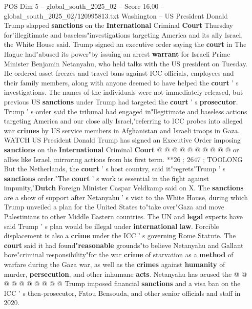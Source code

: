 \begin{textsample}{POS Dim 5 – global\_south\_2025\_02 – Score 16.00 – global\_south\_2025\_02/120995813.txt}  \label{ex:f5_pos_214}
Washington -- US President Donald Trump slapped \textbf{sanctions} on the \textbf{International} Criminal \textbf{Court} Thursday for"illegitimate and baseless"investigations targeting America and its ally Israel, the White House said.
Trump signed an executive order saying the \textbf{court} in The Hague had"abused its power"by issuing an arrest \textbf{warrant} for Israeli Prime Minister Benjamin Netanyahu, who held talks with the US president on Tuesday.
He ordered asset freezes and travel bans against ICC officials, employees and their family members, along with anyone deemed to have helped the \textbf{court} ' s investigations.
The names of the individuals were not immediately released, but previous US \textbf{sanctions} under Trump had targeted the \textbf{court} ' s \textbf{prosecutor}.
Trump ' s order said the tribunal had engaged in"llegitimate and baseless actions targeting America and our close ally Israel,"referring to ICC probes into alleged war \textbf{crimes} by US service members in Afghanistan and Israeli troops in Gaza.
WATCH US President Donald Trump has signed an Executive Order imposing \textbf{sanctions} on the \textbf{International} Criminal \textbf{Court} @ @ @ @ @ @ @ @ @ @ or allies like Israel, mirroring actions from his first term. **26 ; 2647 ; TOOLONG But the Netherlands, the \textbf{court} ' s host country, said it"regrets"Trump ' s \textbf{sanctions} order."The \textbf{court} ' s work is essential in the fight against impunity,"\textbf{Dutch} Foreign Minister Caspar Veldkamp said on X.
The \textbf{sanctions} are a show of support after Netanyahu ' s visit to the White House, during which Trump unveiled a plan for the United States to"take over"Gaza and move Palestinians to other Middle Eastern countries.
The UN and \textbf{legal} experts have said Trump ' s plan would be illegal under \textbf{international} \textbf{law}.
Forcible displacement is also a \textbf{crime} under the ICC ' s governing Rome Statute.
The \textbf{court} said it had found"\textbf{reasonable} grounds"to believe Netanyahu and Gallant bore"criminal responsibility"for the war \textbf{crime} of starvation as a \textbf{method} of warfare during the Gaza war, as well as the \textbf{crimes} against \textbf{humanity} of murder, \textbf{persecution}, and other inhumane \textbf{acts}.
Netanyahu has acused the @ @ @ @ @ @ @ @ @ @ Trump imposed financial \textbf{sanctions} and a visa ban on the ICC ' s then-prosecutor, Fatou Bensouda, and other senior officials and staff in 2020.

\end{textsample}
